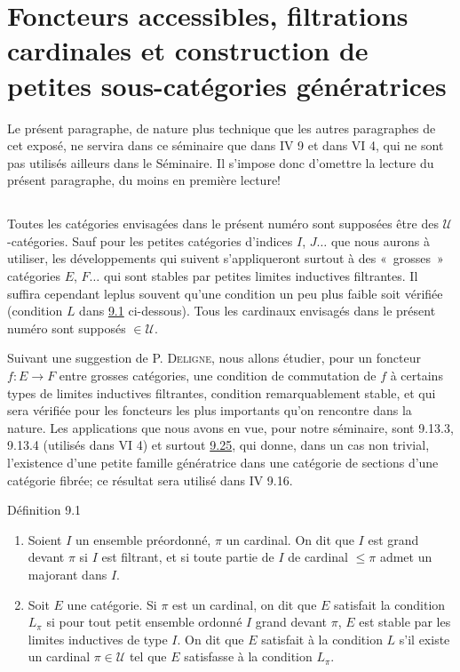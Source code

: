\documentclass[10pt]{../fichiers-configuration-latex/smfart}
\def\labelenumi{(\theenumi)}
\begin{document}
\section{Foncteurs accessibles, filtrations cardinales et construction
de petites sous-catégories génératrices}

Le présent paragraphe, de nature plus technique que les autres
paragraphes de cet exposé, ne servira dans ce séminaire que dans IV
9 et dans VI 4, qui ne sont pas utilisés ailleurs dans le Séminaire.
Il s'impose donc d'omettre la lecture du présent paragraphe, du
moins en première lecture!

\setcounter{subsection}{-1}
\subsection{}
Toutes les catégories envisagées dans le présent numéro sont
supposées être des $𝒰$-catégories. Sauf pour les petites
catégories d'indices $I$, $J\ldots$ que nous aurons à utiliser, les
développements qui suivent s'appliqueront surtout à des « grosses »
catégories $E$, $F\ldots$ qui sont stables par petites limites
inductives filtrantes. Il suffira cependant le\pageoriginale plus
souvent qu'une condition un peu plus faible soit vérifiée (condition
$L$ dans \hyperref[I.def9.1]{9.1} ci-dessous). Tous les cardinaux envisagés dans le
présent numéro sont supposés $\in 𝒰$.

Suivant une suggestion de P. \textsc{Deligne}, nous allons étudier,
pour un foncteur $f:E\rightarrow F$ entre grosses catégories, une
condition de commutation de $f$ à certains types de limites
inductives filtrantes, condition remarquablement stable, et qui sera
vérifiée pour les foncteurs les plus importants qu'on rencontre dans
la nature. Les applications que nous avons en vue, pour notre
séminaire, sont 9.13.3, 9.13.4 (utilisés dans VI
4) et surtout \hyperref[I.cor9.25]{9.25},
qui donne, dans un cas non trivial, l'existence d'une petite famille
génératrice dans une catégorie de sections d'une
catégorie fibrée;
ce résultat sera utilisé dans IV 9.16.

\begin{enonce*}{Définition 9.1}
\begin{enumerate}
\renewcommand{\theenumi}{\alph{enumi}}
\renewcommand{\labelenumi}{\theenumi)}
\item Soient $I$ un ensemble préordonné, $\pi$ un cardinal. On
dit que $I$ est grand devant $\pi$ si $I$ est filtrant, et si toute
partie de $I$ de cardinal $\leq \pi$ admet un majorant dans $I$.

\item Soit $E$ une catégorie. Si $\pi$ est un cardinal, on dit que
$E$ satisfait la condition $L_{\pi}$ si pour tout petit ensemble
ordonné $I$ grand devant $\pi$, $E$ est stable par les limites
inductives de type $I$. On dit que $E$ satisfait à la condition $L$
s'il existe un cardinal $\pi\in 𝒰$ tel que $E$ satisfasse à
la condition $L_{\pi}$.
\end{enumerate}
\end{enonce*}
\end{document}
